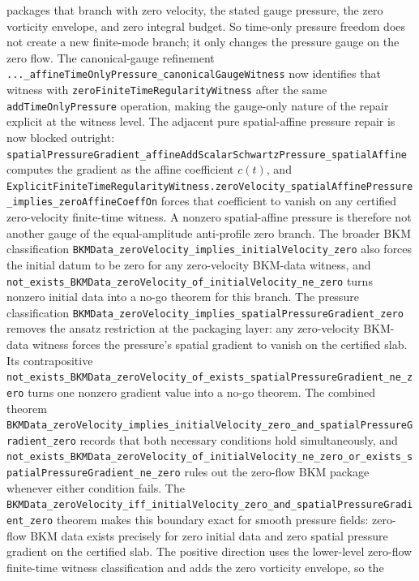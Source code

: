 \documentclass[11pt]{article}
\theoremstyle{remark}
\begin{document}
packages that branch with zero velocity, the stated gauge pressure, the zero
vorticity envelope, and zero integral budget.  So time-only pressure freedom
does not create a new finite-mode branch; it only changes the pressure gauge on
the zero flow.  The canonical-gauge refinement
\texttt{...\_affineTimeOnlyPressure\_canonicalGaugeWitness} now identifies that
witness with \texttt{zeroFiniteTimeRegularityWitness} after the same
\texttt{addTimeOnlyPressure} operation, making the gauge-only nature of the
repair explicit at the witness level.
The adjacent pure spatial-affine pressure repair is now blocked outright:
\texttt{spatialPressureGradient\_affineAddScalarSchwartzPressure\_spatialAffine}
computes the gradient as the affine coefficient \(c(t)\), and
\texttt{ExplicitFiniteTimeRegularityWitness.zeroVelocity\_spatialAffinePressure\_implies\_zeroAffineCoeffOn}
forces that coefficient to vanish on any certified zero-velocity finite-time
witness.  A nonzero spatial-affine pressure is therefore not another gauge of
the equal-amplitude anti-profile zero branch.  The broader BKM classification
\texttt{BKMData\_zeroVelocity\_implies\_initialVelocity\_zero} also forces the
initial datum to be zero for any zero-velocity BKM-data witness, and
\texttt{not\_exists\_BKMData\_zeroVelocity\_of\_initialVelocity\_ne\_zero}
turns nonzero initial data into a no-go theorem for this branch.  The pressure
classification
\texttt{BKMData\_zeroVelocity\_implies\_spatialPressureGradient\_zero}
removes the ansatz restriction at the packaging layer: any zero-velocity
BKM-data witness forces the pressure's spatial gradient to vanish on the
certified slab.  Its contrapositive
\texttt{not\_exists\_BKMData\_zeroVelocity\_of\_exists\_spatialPressureGradient\_ne\_zero}
turns one nonzero gradient value into a no-go theorem.  The combined theorem
\texttt{BKMData\_zeroVelocity\_implies\_initialVelocity\_zero\_and\_spatialPressureGradient\_zero}
records that both necessary conditions hold simultaneously, and
\texttt{not\_exists\_BKMData\_zeroVelocity\_of\_initialVelocity\_ne\_zero\_or\_exists\_spatialPressureGradient\_ne\_zero}
rules out the zero-flow BKM package whenever either condition fails.  The
\texttt{BKMData\_zeroVelocity\_iff\_initialVelocity\_zero\_and\_spatialPressureGradient\_zero}
theorem makes this boundary exact for smooth pressure fields: zero-flow BKM
data exists precisely for zero initial data and zero spatial pressure gradient
on the certified slab.  The positive direction uses the lower-level zero-flow
finite-time witness classification and adds the zero vorticity envelope, so the
\end{document}
